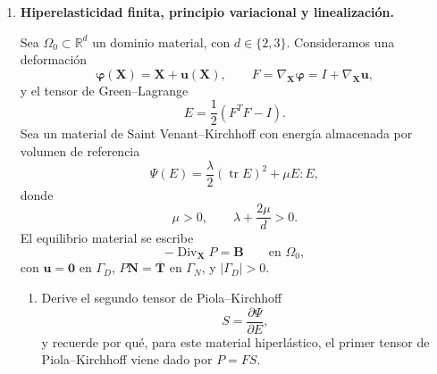 \documentclass[11pt]{article}
\newcommand{\R}{\mathbb{R}}
\DeclareMathOperator{\Div}{Div}
\DeclareMathOperator{\tr}{tr}
\begin{document}
\begin{enumerate}[label=\textbf{\arabic*.}, leftmargin=*]
\begin{enumerate}[label=(\alph*), leftmargin=*]
    \item Aplique Euler impl\'icito a la ecuaci\'on t\'ermica y derive la formulaci\'on d\'ebil para calcular $\theta^{n+1}\in H^1(\Omega_0)$, considerando $g_{\mathrm{mec}}^{n+1}$ como dato conocido.

    \item Pruebe existencia y unicidad de $\theta^{n+1}$ usando Lax--Milgram. Indique claramente las hip\'otesis necesarias sobre $R_0^{n+1}$, $g_{\mathrm{mec}}^{n+1}$ y $\theta^n$.

    \item Suponga ahora que, en vez de evaluarse expl\'icitamente, la fuente mec\'anica contiene un t\'ermino de reacci\'on de la forma $m(\bm X)\theta^{n+1}$. Explique qu\'e condici\'on adicional permitir\'ia conservar coercividad.
\end{enumerate}

\item \textbf{Hiperelasticidad finita, principio variacional y linealizaci\'on.}

Sea $\Omega_0\subset\R^d$ un dominio material, con $d\in\{2,3\}$. Consideramos una deformaci\'on
\begin{equation*}
    \bm\varphi(\bm X)=\bm X+\bm u(\bm X),
    \qquad
    F=\nabla_{\bm X}\bm\varphi=I+\nabla_{\bm X}\bm u,
\end{equation*}
y el tensor de Green--Lagrange
\begin{equation*}
    E=\frac12(F^TF-I).
\end{equation*}
Sea un material de Saint Venant--Kirchhoff con energ\'ia almacenada por volumen de referencia
\begin{equation*}
    \Psi(E)=\frac{\lambda}{2}(\tr E)^2+\mu E:E,
\end{equation*}
donde
\begin{equation*}
    \mu>0,
    \qquad
    \lambda+\frac{2\mu}{d}>0.
\end{equation*}
El equilibrio material se escribe
\begin{equation*}
    -\Div_{\bm X}P=\bm B
    \qquad\text{en }\Omega_0,
\end{equation*}
con $\bm u=\bm0$ en $\Gamma_D$, $P\bm N=\overline{\bm T}$ en $\Gamma_N$, y $|\Gamma_D|>0$.

\begin{enumerate}[label=(\alph*), leftmargin=*]
    \item Derive el segundo tensor de Piola--Kirchhoff
    \begin{equation*}
        S=\frac{\partial\Psi}{\partial E},
    \end{equation*}
    y recuerde por qu\'e, para este material hiperl\'astico, el primer tensor de Piola--Kirchhoff viene dado por $P=FS$.


\end{enumerate}
\end{enumerate}
\end{document}
